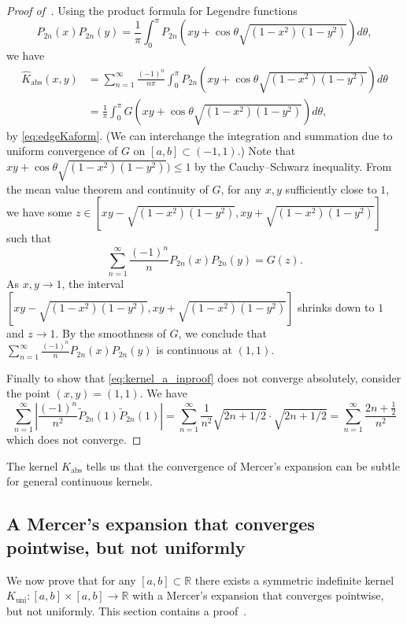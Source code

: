 \documentclass{article}
\begin{document}
\begin{proof}[Proof of~]
Using the product formula for Legendre functions \citep[\S 3.15, eq. (20)]{erdelyi1953higher}
\begin{equation*}
    P_{2n}(x)P_{2n}(y) = \frac{1}{\pi}\int_0^\pi P_{2n}\left(xy + \cos\theta\sqrt{(1-x^2)(1-y^2)}\right) d\theta,
\end{equation*}
we have
\begin{align*}
    \hat{K}_{\text{abs}}(x, y) &= \sum_{n=1}^\infty\frac{(-1)^n}{n\pi}\int_0^\pi P_{2n}\left(xy+\cos\theta\sqrt{(1-x^2)(1-y^2)}\right) d\theta\\
    &=\frac{1}{\pi}\int_0^\pi G\left(xy+\cos\theta\sqrt{(1-x^2)(1-y^2)}\right) d\theta,
\end{align*}
by \cref{eq:edgeKaform}. (We can interchange the integration and summation due to uniform convergence of $G$ on $[a, b]\subset(-1, 1)$.) Note that $xy+\cos\theta\sqrt{(1-x^2)(1-y^2)})\leq 1$ by the Cauchy--Schwarz inequality. From the mean value theorem and continuity of $G$, for any $x, y$ sufficiently close to $1$, we have some $z\in[xy-\sqrt{(1-x^2)(1-y^2)}, xy+\sqrt{(1-x^2)(1-y^2)}]$ such that
\begin{equation*}
    \sum_{n=1}^\infty \frac{(-1)^n}{n}P_{2n}(x)P_{2n}(y) = G(z). 
\end{equation*}
As $x, y\to 1$, the interval $\left[xy-\sqrt{(1-x^2)(1-y^2)}, xy+\sqrt{(1-x^2)(1-y^2)}\right]$ shrinks down to $1$ and $z\to 1$. By the smoothness of $G$, we conclude that $\sum_{n=1}^\infty \frac{(-1)^n}{n}P_{2n}(x)P_{2n}(y)$ is continuous at $(1,1)$. 

\par Finally to show that \cref{eq:kernel_a_inproof} does not converge absolutely, consider the point $(x, y) = (1, 1)$. We have
\begin{equation*}
    \sum_{n=1}^\infty\left|\frac{(-1)^n}{n^2}\tilde{P}_{2n}(1)\tilde{P}_{2n}(1)\right| = \sum_{n=1}^\infty \frac{1}{n^2}\sqrt{2n+1/2}\cdot\sqrt{2n+1/2}  = \sum_{n=1}^\infty \frac{2n+\frac{1}{2}}{n^2}
\end{equation*}
which does not converge. 
\end{proof}

The kernel $K_{\text{abs}}$ tells us that the convergence of Mercer's expansion can be subtle for general continuous kernels.

\subsection{A Mercer's expansion that converges pointwise, but not uniformly}
We now prove that for any $[a,b]\subset \mathbb{R}$ there exists a symmetric indefinite kernel $K_{\text{uni}}:[a,b]\times [a,b]\rightarrow\mathbb{R}$ with a Mercer's expansion that converges pointwise, but not uniformly. This section contains a proof~. 
\end{document}
